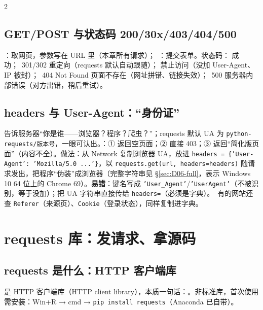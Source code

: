 \begin{multicols}{2}\raggedcolumns\sloppy
\subsection{GET/POST 与状态码 200/30x/403/404/500}
：取网页，参数写在 URL 里（本章所有请求）；\tagext\ ：提交表单。状态码： 成功；\tagext\ 301/302 重定向（requests 默认自动跟随）； 禁止访问（没加 User-Agent、IP 被封）；\tagext\ 404 Not Found 页面不存在（网址拼错、链接失效）；\tagext\ 500 服务器内部错误（对方出错，稍后重试）。

\subsection{headers 与 User-Agent：“身份证”}
 告诉服务器“你是谁——浏览器？程序？爬虫？”；requests 默认 UA 为 \texttt{python-requests/版本号}，一眼可认出。：① 返回空页面；② 直接 403；③ 返回“简化版页面”（内容不全）。做法：从 Network 复制浏览器 UA，放进 \texttt{headers = \{'User-Agent': 'Mozilla/5.0 ...'\}}，以 \texttt{requests.get(url, headers=headers)} 随请求发出，把程序“伪装”成浏览器（完整字符串见 §\ref{sec:D06-full}，表示 Windows 10 64 位上的 Chrome 69）。\textbf{易错}：键名写成 \texttt{'User\_Agent'}/\texttt{'UserAgent'}（不被识别，等于没加）；把 UA 字符串直接传给 \texttt{headers=}（必须是字典）。\tagext\ 有的网站还查 \texttt{Referer}（来源页）、\texttt{Cookie}（登录状态），同样复制进字典。
\end{multicols}

\section{requests 库：发请求、拿源码}

\subsection{requests 是什么：HTTP 客户端库}
 是 HTTP 客户端库（HTTP client library），本质一句话：。非标准库，首次使用需安装：Win+R → cmd → \texttt{pip install requests}（Anaconda 已自带）。

